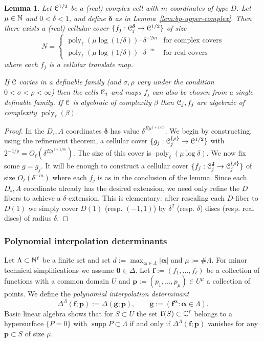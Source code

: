 \documentclass[reqno]{amsart}
\newtheorem{Lem}[Cor]{Lemma}{\bfseries}{\itshape}
\renewcommand\~[1]{\widetilde{#1}}
\def\poly{\operatorname{poly}} \def\J{\operatorname{J}}
\def\supp{\operatorname{supp}}
\def\vf{{\mathbf f}}
\def\vg{{\mathbf g}}
\def\vp{{\mathbf p}}
\def\valpha{{\boldsymbol\alpha}}
\def\vdelta{{\boldsymbol\delta}}
\def\he#1{{\{#1\}}}
\def\hrho{{\he\rho}}
\begin{document}
\begin{Lem}\label{lem:refinement-special}
  Let ${\mathcal C}^{1/2}$ be a (real) complex cell with $m$ coordinates of
  type $D$. Let $\mu\in{\mathbb N}$ and $0<\delta<1$, and define $\vdelta$ as
  in Lemma~\ref{lem:bp-upper-complex}. Then there exists a (real)
  cellular cover $\{f_j:\cC^\vdelta_j\to\cC^{1/2}\}$ of size
  \begin{equation}
    N =
    \begin{cases}
      \poly_\ell(\mu\log(1/\delta))\cdot\delta^{-2m} & \text{for complex covers} \\
      \poly_\ell(\mu\log(1/\delta))\cdot\delta^{-m} & \text{for real covers}
    \end{cases}
  \end{equation}
  where each $f_j$ is a cellular translate map.

  If ${\mathcal C}$ varies in a definable family (and $\sigma,\rho$ vary under
  the condition $0<\sigma<\rho<\infty$) then the cells ${\mathcal C}_j$ and
  maps $f_j$ can also be chosen from a single definable family. If
  ${\mathcal C}$ is algebraic of complexity $\beta$ then ${\mathcal C}_j,f_j$ are
  algebraic of complexity $\poly_\ell(\beta)$.
\end{Lem}
\begin{proof}
  In the $D_\circ,A$ coordinates $\vdelta$ has value
  $\delta^{E\mu^{1+1/m}}$. We begin by constructing, using the
  refinement theorem, a cellular cover
  $\{g_j:\cC^\hrho_j\to\cC^{1/2}\}$ with
  $2^{-1/\rho}=O_\ell(\delta^{E\mu^{1+1/m}})$. The size of this cover
  is $\poly_\ell(\mu\log\delta)$. We now fix some $g=g_j$. It will be
  enough to construct a cellular cover
  $\{f_j:\cC^\vdelta_j\to\cC_j^{\hrho}\}$ of size
  $O_\ell(\delta^{-m})$ where each $f_j$ is as in the conclusion of
  the lemma. Since each $D_\circ,A$ coordinate already has the desired
  extension, we need only refine the $D$ fibers to achieve a
  $\delta$-extension. This is elementary: after rescaling each
  $D$-fiber to $D(1)$ we simply cover $D(1)$ (resp. $(-1,1)$) by
  $\delta^2$ (resp. $\delta$) discs (resp. real discs) of radius
  $\delta$.
\end{proof}

\subsubsection{Polynomial interpolation determinants}

Let $\Lambda\subset{\mathbb N}^\ell$ be a finite set and set
$d:=\max_{\valpha\in\Lambda}|\valpha|$ and $\mu:=\#\Lambda$. For minor
technical simplifications we assume ${\mathbf 0}\in\Delta$. Let
$\vf:=(f_1,\ldots,f_\ell)$ be a collection of functions with a common
domain $U$ and $\vp:=(p_1,\ldots,p_\mu)\in U^\mu$ a collection of
points. We define the \emph{polynomial interpolation determinant}
\begin{equation}
  \Delta^\Lambda(\vf;\vp) := \Delta(\vg;\vp), \qquad \vg:=(\vf^\valpha:\valpha\in\Lambda).
\end{equation}
Basic linear algebra shows that for $S\subset U$ the set
$\vf(S)\subset\C^\ell$ belongs to a hypersurface $\{P=0\}$ with
$\supp P\subset\Lambda$ if and only if $\Delta^\Lambda(\vf;\vp)$
vanishes for any $\vp\subset S$ of size $\mu$.
\end{document}
